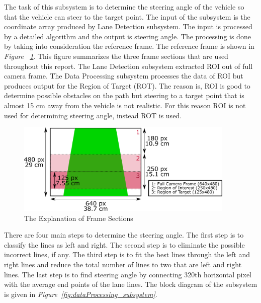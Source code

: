 \documentclass[a4paper,12pt]{article}
\begin{document}
\begin{enumerate}
The task of this subsystem is to determine the steering angle of the vehicle so that the vehicle can steer to the target point. The input of the subsystem is the coordinate array produced by Lane Detection subsystem. The input is processed by a detailed algorithm and the output is steering angle. The processing is done by taking into consideration the reference frame. The reference frame is shown in \textit{Figure ~\ref{fig:camera_vision_explained}}. This figure summarizes the three frame sections that are used throughout this report. The Lane Detection subsystem extracted ROI out of full camera frame. The Data Processing subsystem processes the data of ROI but produces output for the Region of Target (ROT). The reason is, ROI is good to determine possible obstacles on the path but steering to a target point that is almost 15 cm away from the vehicle is not realistic.  For this reason ROI is not used for determining steering angle, instead ROT is used.



\begin{figure}[H]

\centering

\includegraphics[width=0.93\textwidth]{images/camera_vision_explained}

\caption{The Explanation of Frame Sections}\label{fig:camera_vision_explained}

\end{figure}	


There are four main steps to determine the steering angle.  The first step is to classify the lines as left and right. The second step is to eliminate the possible incorrect lines, if any. The third step is to fit the best lines through the left and right lines and reduce the total number of lines to two that are left and right lines. The last step is to find steering angle by connecting 320th horizontal pixel with the average end points of the lane lines. The block diagram of the subsystem is given in \textit{Figure~\ref{fig:dataProcessing_subsystem}}.




\end{enumerate}
\end{document}
